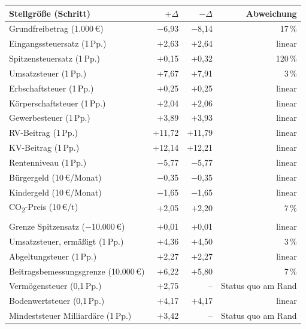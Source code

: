 \begin{tabular}{@{}lrrr@{}}
\toprule
Stellgröße (Schritt) & $+\Delta$ & $-\Delta$ & Abweichung \\
\midrule
Grundfreibetrag (1.000\,\euro{}) & $-$6,93 & $-$8,14 & 17\,\% \\
Eingangssteuersatz (1\,Pp.) & $+$2,63 & $+$2,64 & linear \\
Spitzensteuersatz (1\,Pp.) & $+$0,15 & $+$0,32 & 120\,\% \\
Umsatzsteuer (1\,Pp.) & $+$7,67 & $+$7,91 & 3\,\% \\
Erbschaftsteuer (1\,Pp.) & $+$0,25 & $+$0,25 & linear \\
Körperschaftsteuer (1\,Pp.) & $+$2,04 & $+$2,06 & linear \\
Gewerbesteuer (1\,Pp.) & $+$3,89 & $+$3,93 & linear \\
RV-Beitrag (1\,Pp.) & $+$11,72 & $+$11,79 & linear \\
KV-Beitrag (1\,Pp.) & $+$12,14 & $+$12,21 & linear \\
Rentenniveau (1\,Pp.) & $-$5,77 & $-$5,77 & linear \\
Bürgergeld (10\,\euro{}/Monat) & $-$0,35 & $-$0,35 & linear \\
Kindergeld (10\,\euro{}/Monat) & $-$1,65 & $-$1,65 & linear \\
CO\textsubscript{2}-Preis (10\,\euro{}/t) & $+$2,05 & $+$2,20 & 7\,\% \\
\addlinespace
\multicolumn{4}{@{}l}{\emph{Weitere Stellgrößen}} \\
Grenze Spitzensatz ($-$10.000\,\euro{}) & $+$0,01 & $+$0,01 & linear \\
Umsatzsteuer, ermäßigt (1\,Pp.) & $+$4,36 & $+$4,50 & 3\,\% \\
Abgeltungsteuer (1\,Pp.) & $+$2,27 & $+$2,27 & linear \\
Beitragsbemessungsgrenze (10.000\,\euro{}) & $+$6,22 & $+$5,80 & 7\,\% \\
Vermögensteuer (0,1\,Pp.) & $+$2,75 & -- & Status quo am Rand \\
Bodenwertsteuer (0,1\,Pp.) & $+$4,17 & $+$4,17 & linear \\
Mindeststeuer Milliardäre (1\,Pp.) & $+$3,42 & -- & Status quo am Rand \\
\bottomrule
\end{tabular}
